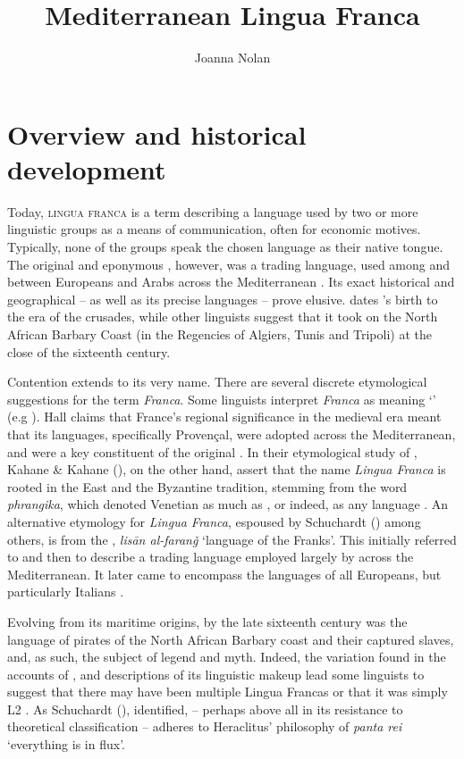 \documentclass[output=paper]{langsci/langscibook}
\title{Mediterranean Lingua Franca}
\author{Joanna Nolan\affiliation{SOAS University of London}}
\begin{document}
	
\section{Overview and historical development}
	
	Today, \textsc{lingua franca} is a term describing a language used by two or more linguistic groups as a means of communication, often for economic motives. Typically, none of the groups speak the chosen language as their native tongue. The original and eponymous , however, was a trading language, used among and between Europeans and Arabs across the Mediterranean \citep{KahaneKahane1976}. Its exact historical and geographical  – as well as its precise  languages – prove elusive. \citet{Hall1966} dates ’s birth to the era of the crusades, while other linguists \citep{Cifoletti2004,Minervini1996} suggest that it took  on the North African Barbary Coast (in the Regencies of Algiers, Tunis and Tripoli) at the close of the sixteenth century. 
	
	Contention extends to its very name. There are several discrete etymological suggestions for the term \textit{Franca}.  Some linguists interpret \textit{Franca} as meaning ‘’ (e.g \citealt[3]{Hall1966}). Hall claims that France’s regional significance in the medieval era meant that its languages, specifically Provençal, were adopted across the Mediterranean, and were a key constituent of the original . In their etymological study of , Kahane \& Kahane (\citeyear[25]{KahaneKahane1976}), on the other hand, assert that the name \textit{Lingua Franca} is rooted in the East and the Byzantine tradition, stemming from the  word \textit{phrangika}, which denoted Venetian as much as , or indeed, as any  language \citep[31]{KahaneKahane1976}. An alternative etymology for \textit{Lingua Franca}, espoused by Schuchardt (\citeyear[74]{Schuchardt1909}) among others, is from the , \textit{lisān al-faranǧ} ‘language of the Franks’. This initially referred to  and then to describe a trading language employed largely by  across the Mediterranean. It later came to encompass the languages of all Europeans, but particularly Italians \citep[26]{KahaneKahane1976}.  
	
	Evolving from its maritime origins, by the late sixteenth century  was the language of pirates of the North African Barbary coast and their captured slaves, and, as such, the subject of legend and myth. Indeed, the variation found in the accounts of , and descriptions of its linguistic makeup lead some linguists \citep{Minervini1996,Mori2016} to suggest that there may have been multiple Lingua Francas or that it was simply L2 . As Schuchardt (\citeyear[88]{Schuchardt1909}), identified,  – perhaps above all in its resistance to theoretical classification – adheres to Heraclitus’ philosophy of \textit{panta rei}  ‘everything is in flux’. 
	
\end{document}
